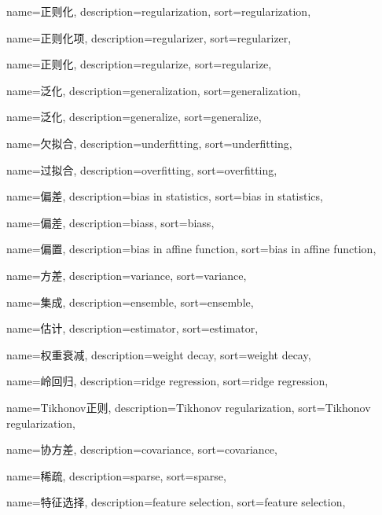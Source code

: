 {
  name=正则化,
  description={regularization},
  sort={regularization},
}

{
  name=正则化项,
  description={regularizer},
  sort={regularizer},
}

{
  name=正则化,
  description={regularize},
  sort={regularize},
}

{
  name=泛化,
  description={generalization},
  sort={generalization},
}

{
	name=泛化,
	description={generalize},
	sort={generalize},
}

{
  name=欠拟合,
  description={underfitting},
  sort={underfitting},
}

{
  name=过拟合,
  description={overfitting},
  sort={overfitting},
}

{
  name=偏差,
  description={bias in statistics},
  sort={bias in statistics},
}

{
  name=偏差,
  description={biass},
  sort={biass},
}

{
  name=偏置,
  description={bias in affine function},
  sort={bias in affine function},
}

{
  name=方差,
  description={variance},
  sort={variance},
}

{
  name=集成,
  description={ensemble},
  sort={ensemble},
}

{
  name=估计,
  description={estimator},
  sort={estimator},
}

{
  name=权重衰减,
  description={weight decay},
  sort={weight decay},
}

{
  name=岭回归,
  description={ridge regression},
  sort={ridge regression},
}

{
  name=Tikhonov正则,
  description={Tikhonov regularization},
  sort={Tikhonov regularization},
}

{
  name=协方差,
  description={covariance},
  sort={covariance},
}

{
  name=稀疏,
  description={sparse},
  sort={sparse},
}

{
  name=特征选择,
  description={feature selection},
  sort={feature selection},
}

